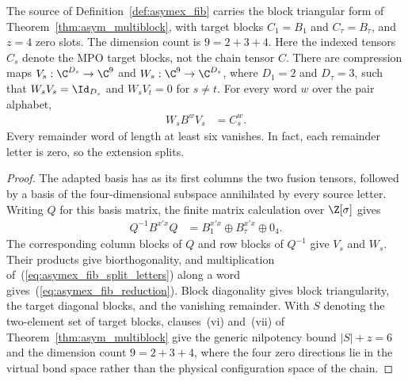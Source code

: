 \begin{lemma}
    \label{thm:asymex_fib_compression}
    \leanok
    The source of Definition~\ref{def:asymex_fib} carries the block
    triangular form of Theorem~\ref{thm:asym_multiblock}, with target
    blocks $C_1=B_1$ and $C_\tau=B_\tau$, and $z=4$ zero slots.
    The dimension count is $9=2+3+4$. Here the indexed tensors $C_s$
    denote the MPO target blocks, not the chain tensor $C$.
    There are compression maps
    $V_s:\C^{D_s}\to\C^9$ and $W_s:\C^9\to\C^{D_s}$,
    where $D_1=2$ and $D_\tau=3$, such that
    $W_sV_s=\Id_{D_s}$ and $W_sV_t=0$ for $s\neq t$.
    For every word $w$ over the pair alphabet,
    \begin{align}
        W_sB^wV_s & =C_s^w.
        \label{eq:asymex_fib_reduction}
    \end{align}
    Every remainder word of length at least six vanishes.
    In fact, each remainder letter is zero, so the extension splits.
\end{lemma}

\begin{proof}
    \leanok
    The adapted basis has as its first columns the two fusion tensors,
    followed by a basis of the four-dimensional subspace annihilated
    by every source letter. Writing $Q$ for this basis matrix,
    the finite matrix calculation over $\Z[\sigma]$ gives
    \begin{align}
        Q^{-1}B^{x'x}Q
         & =B_1^{x'x}\oplus B_\tau^{x'x}\oplus0_4.
        \label{eq:asymex_fib_split_letters}
    \end{align}
    The corresponding column blocks of $Q$ and row blocks of $Q^{-1}$
    give $V_s$ and $W_s$. Their products give biorthogonality, and
    multiplication of~(\ref{eq:asymex_fib_split_letters}) along a word
    gives~(\ref{eq:asymex_fib_reduction}).
    Block diagonality gives block triangularity, the target diagonal
    blocks, and the vanishing remainder. With $S$ denoting the
    two-element set of target blocks, clauses~(vi) and~(vii) of
    Theorem~\ref{thm:asym_multiblock} give the generic nilpotency bound
    $|S|+z=6$ and the dimension count $9=2+3+4$, where the four zero
    directions lie in the virtual bond space rather than the physical
    configuration space of the chain.
\end{proof}

